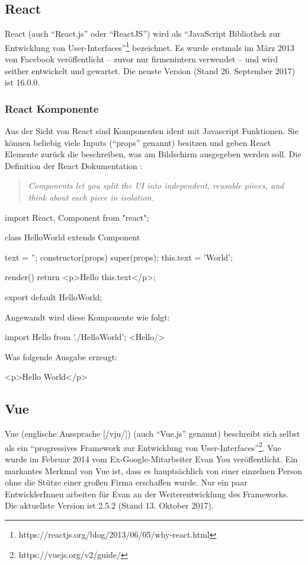 \subsection{React}
React (auch "`React.js"' oder "`ReactJS"') wird als "`JavaScript Bibliothek zur Entwicklung von User-Interfaces"'\footnote{https://reactjs.org/blog/2013/06/05/why-react.html} bezeichnet. Es wurde erstmals im März 2013 von Facebook veröffentlicht -- zuvor nur firmenintern verwendet -- und wird seither entwickelt und gewartet. Die neuste Version (Stand 26. September 2017) ist 16.0.0.

\subsubsection{React Komponente}
Aus der Sicht von React sind Komponenten ident mit Javascript Funktionen. Sie können beliebig viele Inputs ("`props"' genannt) besitzen und geben React Elemente zurück die beschreiben, was am Bildschirm ausgegeben werden soll.
Die Definition der React Dokumentation \cite{react-component}: 
\begin{quote}
	\begin{english}
		\textit{Components let you split the UI into independent, reusable pieces, and think about each piece in isolation.}
	\end{english}
\end{quote}

\begin{JsCode}
	import React, {Component} from "react";
	
	class HelloWorld extends Component {
		text = '';
		constructor(props) {
			super(props);
			this.text = 'World';
		}
		
		render() {
			return <p>Hello {this.text}</p>;
		}
	}
	export default HelloWorld;
\end{JsCode}

Angewandt wird diese Komponente wie folgt:
\begin{JsCode}[numbers=none]
	import Hello from './HelloWorld';
	<Hello/>
\end{JsCode}
Was folgende Ausgabe erzeugt:
\begin{JsCode}[numbers=none]
<p>Hello World</p>
\end{JsCode}

\subsection{Vue }
Vue (englische Aussprache [/vju/]) (auch "`Vue.js"' genannt) beschreibt sich selbst als ein "`progressives Framework zur Entwicklung von User-Interfaces"'\footnote{https://vuejs.org/v2/guide/}. Vue wurde im Februar 2014 vom Ex-Google-Mitarbeiter Evan You veröffentlicht. Ein markantes Merkmal von Vue ist, dass es hauptsächlich von einer einzelnen Person ohne die Stütze einer großen Firma erschaffen wurde. Nur ein paar EntwicklerInnen arbeiten für Evan an der Weiterentwicklung des Frameworks. Die aktuellste Version ist 2.5.2 (Stand 13. Oktober 2017).

